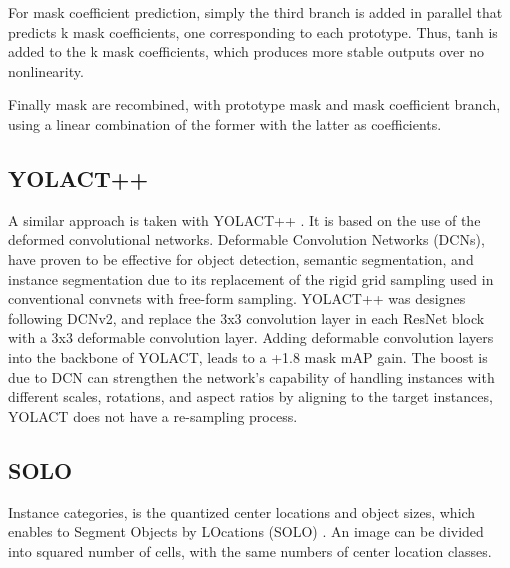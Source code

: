 For mask coefficient prediction, simply the third branch is added in parallel that predicts k mask coefficients, one corresponding to each prototype. Thus, tanh is added
to the k mask coefficients, which produces more stable outputs over no nonlinearity.

Finally mask are recombined, with prototype mask and mask coefficient branch, using a linear combination of the former with the latter as coefficients.

\subsection{YOLACT++}

A similar approach is taken with YOLACT++ \cite{2020}. It is based on the use of the deformed convolutional networks.
Deformable Convolution Networks (DCNs)\cite{dai2017deformable}, \cite{zhu2019deformable} have proven to be effective for object detection, semantic segmentation, and
instance segmentation due to its replacement of the rigid grid sampling used in conventional convnets with free-form sampling.
YOLACT++ was designes following DCNv2, and replace the 3x3 convolution layer in each ResNet block with a 3x3 deformable convolution layer.
Adding deformable convolution layers into the backbone of YOLACT, leads to a +1.8 mask mAP gain. The boost is due to DCN can strengthen the network’s capability of
handling instances with different scales, rotations, and aspect ratios by aligning to the target instances, YOLACT does not have a re-sampling process.
 
\subsection{SOLO}
Instance categories, is the quantized center locations and object sizes, which enables to Segment Objects by LOcations (SOLO) \cite{wang2020solov2}. An image can be divided into squared number
of cells, with the same numbers of center location classes. 












